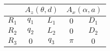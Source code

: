 \begin{tabular}{c|c|c|c|c|}
            \cline{2-5} &
            \multicolumn{2}{|c|}{$A_z(\theta,d)$} &
            \multicolumn{2}{|c|}{$A_x(\alpha,a)$} \\
            \hline
        \multicolumn{1}{|c|}{$R_1$} & $q_{1}$ & $L_{1}$ & $0$ & $D_{1}$ \\
            \hline
        \multicolumn{1}{|c|}{$R_2$} & $q_{2}$ & $L_{2}$ & $0$ & $D_{2}$ \\
            \hline
        \multicolumn{1}{|c|}{$R_3$} & $0$ & $q_{3}$ & $\pi$ & $0$ \\
            \hline
\end{tabular}
